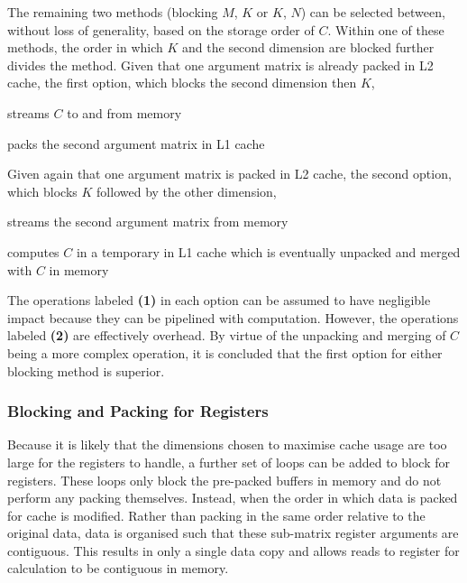 \documentclass[\main/thesis.tex]{subfiles}
\begin{document}
The remaining two methods (blocking $M$, $K$ or $K$, $N$) can be selected between, without loss of generality, based on the storage order of $C$.
Within one of these methods, the order in which $K$ and the second dimension are blocked further divides the method.
Given that one argument matrix is already packed in L2 cache, the first option, which blocks the second dimension then $K$,
\begin{enumerate*}[itemjoin*={{ and }}, label=\textbf{(\arabic*)}, after={.}]
  \item streams $C$ to and from memory
  \item packs the second argument matrix in L1 cache
\end{enumerate*}
Given again that one argument matrix is packed in L2 cache, the second option, which blocks $K$ followed by the other dimension,
\begin{enumerate*}[itemjoin*={{ and }}, label=\textbf{(\arabic*)}, after={.}]
  \item streams the second argument matrix from memory
  \item computes $C$ in a temporary in L1 cache which is eventually unpacked and merged with $C$ in memory
\end{enumerate*}
The operations labeled \textbf{(1)} in each option can be assumed to have negligible impact because they can be pipelined with computation.
However, the operations labeled \textbf{(2)} are effectively overhead.
By virtue of the unpacking and merging of $C$ being a more complex operation, it is concluded that the first option for either blocking method is superior.

\subsubsection{Blocking and Packing for Registers}
Because it is likely that the dimensions chosen to maximise cache usage are too large for the registers to handle, a further set of loops can be added to block for registers.
These loops only block the pre-packed buffers in memory and do not perform any packing themselves.
Instead, when the order in which data is packed for cache is modified.
Rather than packing in the same order relative to the original data, data is organised such that these sub-matrix register arguments are contiguous.
This results in only a single data copy and allows reads to register for calculation to be contiguous in memory.
\end{document}

